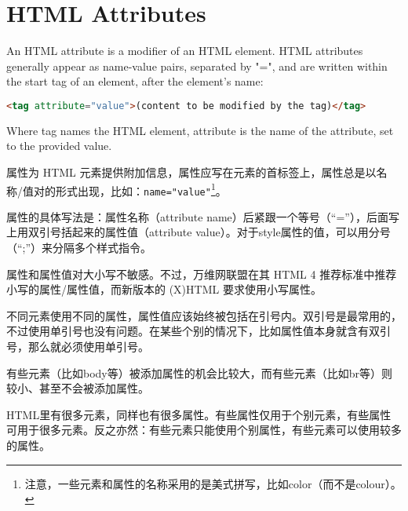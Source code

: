 \part{HTML Attributes}

An HTML attribute is a modifier of an HTML element. HTML attributes generally appear as name-value pairs, separated by "=", and are written within the start tag of an element, after the element's name:

\begin{lstlisting}[language=HTML]
	<tag attribute="value">(content to be modified by the tag)</tag>
\end{lstlisting}

Where tag names the HTML element, attribute is the name of the attribute, set to the provided value.

属性为 HTML 元素提供附加信息，属性应写在元素的首标签上，属性总是以名称/值对的形式出现，比如：\texttt{name="value"}\footnote{注意，一些元素和属性的名称采用的是美式拼写，比如color（而不是colour）。}。

属性的具体写法是：属性名称（attribute name）后紧跟一个等号（“=”），后面写上用双引号括起来的属性值（attribute value）。对于style属性的值，可以用分号（“;”）来分隔多个样式指令。


属性和属性值对大小写不敏感。不过，万维网联盟在其 HTML 4 推荐标准中推荐小写的属性/属性值，而新版本的 (X)HTML 要求使用小写属性。




不同元素使用不同的属性，属性值应该始终被包括在引号内。双引号是最常用的，不过使用单引号也没有问题。在某些个别的情况下，比如属性值本身就含有双引号，那么就必须使用单引号。

有些元素（比如body等）被添加属性的机会比较大，而有些元素（比如br等）则较小、甚至不会被添加属性。

HTML里有很多元素，同样也有很多属性。有些属性仅用于个别元素，有些属性可用于很多元素。反之亦然：有些元素只能使用个别属性，有些元素可以使用较多的属性。





